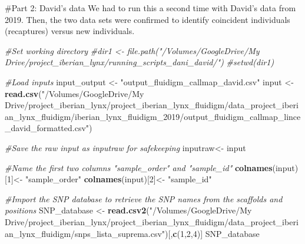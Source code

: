 \documentclass[
]{article}
\newenvironment{Shaded}{\begin{snugshade}}{\end{snugshade}}
\newcommand{\CommentTok}[1]{\textcolor[rgb]{0.56,0.35,0.01}{\textit{#1}}}
\newcommand{\DecValTok}[1]{\textcolor[rgb]{0.00,0.00,0.81}{#1}}
\newcommand{\KeywordTok}[1]{\textcolor[rgb]{0.13,0.29,0.53}{\textbf{#1}}}
\newcommand{\NormalTok}[1]{#1}
\newcommand{\StringTok}[1]{\textcolor[rgb]{0.31,0.60,0.02}{#1}}
\begin{document}
\#Part 2: David's data We had to run this a second time with David's
data from 2019. Then, the two data sets were confirmed to identify
coincident individuals (recaptures) versus new individuals.

\begin{Shaded}
\begin{Highlighting}[]
\CommentTok{#Set working directory}
\CommentTok{#dir1 <- file.path("/Volumes/GoogleDrive/My Drive/project_iberian_lynx/running_scripts_dani_david/")}
\CommentTok{#setwd(dir1)}

\CommentTok{#Load inputs}
\NormalTok{input_output <-}\StringTok{ "output_fluidigm_callmap_david.csv"}
\NormalTok{input <-}\StringTok{ }\KeywordTok{read.csv}\NormalTok{(}\StringTok{"/Volumes/GoogleDrive/My Drive/project_iberian_lynx/project_iberian_lynx_fluidigm/data_project_iberian_lynx_fluidigm/iberian_lynx_fluidigm_2019/output_fluidigm_callmap_lince_david_formatted.csv"}\NormalTok{) }

\CommentTok{#Save the raw input as inputraw for safekeeping}
\NormalTok{inputraw<-}\StringTok{ }\NormalTok{input}

\CommentTok{#Name the first two columns "sample_order" and "sample_id"}
\KeywordTok{colnames}\NormalTok{(input)[}\DecValTok{1}\NormalTok{]<-}\StringTok{ "sample_order"}
\KeywordTok{colnames}\NormalTok{(input)[}\DecValTok{2}\NormalTok{]<-}\StringTok{ "sample_id"}

\CommentTok{#Import the SNP database to retrieve the SNP names from the scaffolds and positions}
\NormalTok{SNP_database <-}\StringTok{ }\KeywordTok{read.csv2}\NormalTok{(}\StringTok{"/Volumes/GoogleDrive/My Drive/project_iberian_lynx/project_iberian_lynx_fluidigm/data_project_iberian_lynx_fluidigm/snps_lista_suprema.csv"}\NormalTok{)[,}\KeywordTok{c}\NormalTok{(}\DecValTok{1}\NormalTok{,}\DecValTok{2}\NormalTok{,}\DecValTok{4}\NormalTok{)]}
\NormalTok{SNP_database}
\end{Highlighting}
\end{Shaded}
\end{document}
